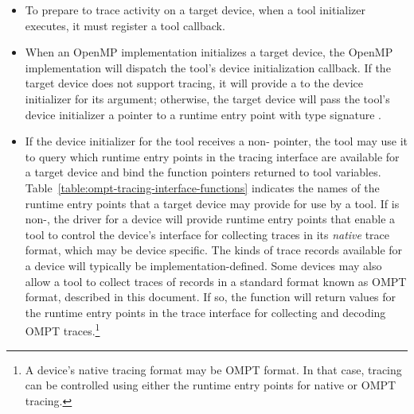 \begin{itemize}
\item To prepare to trace activity on a target device, when a tool
  initializer executes, it must register a tool 
   callback.
\item When an OpenMP implementation initializes a target device, the
  OpenMP implementation will dispatch the tool's device initialization
  callback. If the target device does not support tracing, it
  will provide a  to the device initializer for its
   argument; otherwise, the target device will pass the
  tool's device initializer a pointer to a runtime
  entry point with type signature .
\item If the device initializer for the tool receives a
  non-  pointer, the tool may use it to query
  which runtime entry points in the tracing interface are available for a target device
  and bind the function pointers returned to tool variables.
  Table~\ref{table:ompt-tracing-interface-functions} indicates the
  names of the runtime entry points that a target device may provide for use
  by a tool.  If  is non-, the driver for a device will
  provide runtime entry points that enable a tool to control the device's
  interface for collecting traces in its \emph{native} trace format,
  which may be device specific. 
  The kinds of trace records available for a device will typically be
  implementation-defined.
  Some devices may also allow a tool to
  collect traces of records in a standard format known as OMPT format,
  described in this document. If so, the  function will
  return values for the runtime entry points in the trace interface for
  collecting and decoding OMPT traces.\footnote{A device's native
    tracing format may be OMPT format. In that case, tracing can be
    controlled using either the runtime entry points for native or OMPT
    tracing.}


\end{itemize}
